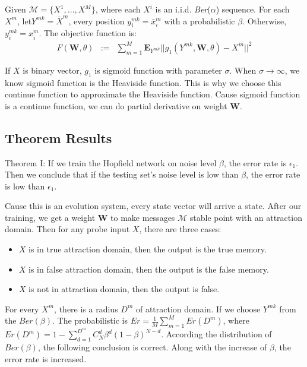 Given $\mathcal{M} = \{X^1, ..., X^M\}$, where each $X^i$ is an i.i.d. \emph{Ber}($\alpha$) sequence. For each $X^m$, let$Y^{mk} = \bar{X}^m$, every position $y_i^{mk} = \bar{x}_i^m$ with a probabilistic $\beta$. Otherwise, $y_i^{mk} = x_i^m$. The objective function is:
\begin{eqnarray*}
  F(\textbf{W}, \theta) &:=& \sum_{m=1}^{M}  \textbf{E}_{Y^{mk}} ||g_1(Y^{mk}, \textbf{W}, \theta) - X^m||^2
\end{eqnarray*}

If $X$ is binary vector, $g_1$ is sigmoid function with parameter $\sigma$. 
When $\sigma \rightarrow \infty$, we know sigmoid function is the Heaviside function. 
This is why we choose this continue function to approximate the Heaviside function. Cause sigmoid function is a continue function, we can do partial derivative on weight $\textbf{W}$.

\subsection{Theorem Results}
Theorem I: If we train the Hopfield network on noise level $\beta$, the error rate is $\epsilon_1$. 
Then we conclude that if the testing set's noise level is low than $\beta$, the error rate is low than $\epsilon_1$.

Cause this is an evolution system, every state vector will arrive a state. 
After our training, we get a weight $\textbf{W}$ to make messages $\mathcal{M}$ stable point with an attraction domain. 
Then for any probe input $X$, there are three cases:
\begin{itemize}
  \item $X$ is in true attraction domain, then the output is the true memory.
  \item $X$ is in false attraction domain, then the output is the false memory.
  \item $X$ is not in attraction domain, then the output is false.
\end{itemize}

For every $X^m$, there is a radius $D^m$ of attraction domain. 
If we choose $Y^{mk}$ from the $Ber(\beta)$. 
The probabilistic is $Er = \frac{1}{M} \sum_{m=1}^{M}Er(D^m)$, where $Er(D^m) = 1 - \sum_{d=1}^{D^m} C_N^d \beta^d (1 - \beta)^{N-d}$. 
According the distribution of $Ber(\beta)$, the following conclusion is correct.
Along with the increase of $\beta$, the error rate is increased.

